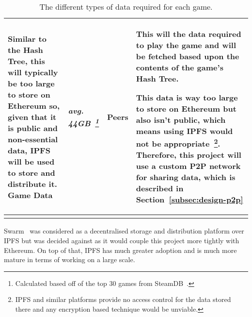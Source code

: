 \begin{longtable}{ p{} p{} p{} p{} }
  \vspace{1mm}
  Similar to the Hash Tree, this will typically be too large to store on Ethereum so, given that it is public and non-essential data, IPFS will be used to store and distribute it. 
  \x
  Game Data
  & \textit{avg. 44GB~\footnote{Calculated based off of the top 30 games from SteamDB~\cite{noauthor_steam_nodate}.}}
  & Peers
  & This will the data required to play the game and will be fetched based upon the contents of the game's Hash Tree.

  \vspace{1mm}
  This data is way too large to store on Ethereum but also isn't public, which means using IPFS would not be appropriate~\footnote{IPFS and similar platforms provide no access control for the data stored there and any encryption based technique would be unviable.}. Therefore, this project will use a custom P2P network for sharing data, which is described in Section~\ref{subsec:design-p2p} 
  \\\bottomrule\bottomrule
  \caption{The different types of data required for each game.}
  \label{tab:data}
\end{longtable}

\noindent 
Swarm~\cite{hartman_swarm_1999} was considered as a decentralised storage and distribution platform over IPFS but was decided against as it would couple this project more tightly with Ethereum. On top of that, IPFS has much greater adoption and is much more mature in terms of working on a large scale.